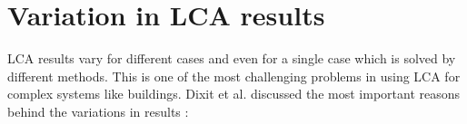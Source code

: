 \documentclass[10pt]{article}
\begin{document}
 






\section{Variation in LCA results}
 
LCA results vary for different cases and even for a single case which is solved by different methods. This is one of the most challenging problems in using LCA for complex systems like buildings. Dixit et al.  discussed the most important reasons behind the variations in results \cite{dixit2010identification}:
\end{document}
